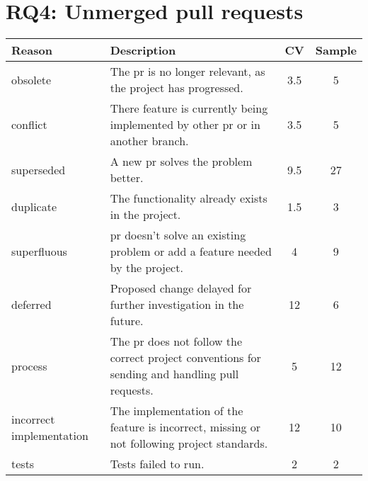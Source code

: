 \documentclass{sig-alternate}
\begin{document}

\section{RQ4: Unmerged pull requests}

\begin{table}[t]
  \begin{small}
  \centering
  \begin{tabular}{p{6em}p{14em}cc}
    \hline
    \textbf{Reason} & \textbf{Description} & \textbf{CV} &
    \textbf{Sample}
\\
    \hline
    \textsf{obsolete} &	The {\sc pr} is no longer relevant, as the project
    has progressed. & 3.5 & 5\\

    \textsf{conflict} &	There feature is currently being implemented by other
    {\sc pr} or in another branch. &  3.5 & 5\\

    \textsf{superseded} &	A new {\sc pr} solves the problem better. & 9.5 & 27\\

    \textsf{duplicate} & The functionality already exists in the project. & 1.5 & 3 \\

    \textsf{superfluous} & {\sc pr} doesn't solve an existing problem or add a
    feature needed by the project. & 4 & 9\\

    \textsf{deferred} & Proposed change delayed for further investigation in the
    future. & 12 & 6\\

    \textsf{process} & The {\sc pr} does not follow the correct project
    conventions for sending and handling pull requests. & 5 & 12\\

    \textsf{incorrect implementation} &	The implementation of the feature is
    incorrect, missing or not following project standards. & 12 & 10\\

    \textsf{tests} & Tests failed to run. & 2 & 2\\


\end{tabular}
\end{small}
\end{table}
\end{document}
